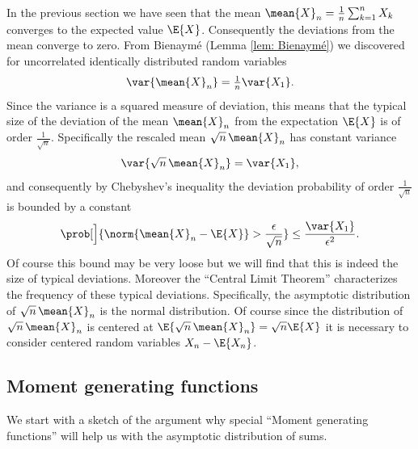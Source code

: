 In the previous section we have seen that the mean \(\mean{X}_n =
\frac1n\sum_{k=1}^n X_k\) converges to the expected value \(\E{X}\).
Consequently the deviations from the mean converge to zero. From Bienaymé (Lemma
\ref{lem: Bienaymé}) we discovered for uncorrelated identically distributed
random variables
\[
    \var{\mean{X}_n} = \tfrac1n \var{X_1}.
\]
Since the variance is a squared measure of deviation, this means
that the typical size of the deviation of the mean \(\mean{X}_n\) from the expectation
\(\E{X}\) is of order \(\frac1{\sqrt{n}}\).
Specifically the rescaled mean \(\sqrt{n}\,\mean{X}_n\) has
constant variance
\[
    \var{\sqrt{n}\,\mean{X}_n} = \var{X_1},
\]
and consequently by Chebyshev's inequality the deviation probability of order \(\frac{1}{\sqrt{n}}\) is
bounded by a constant
\[
    \prob[\Big]{\norm{\mean{X}_n - \E{X}} > \frac{\epsilon}{\sqrt{n}}}
    \le \frac{\var{X_1}}{\epsilon^2}.
\]
Of course this bound may be very loose but we will find that this is indeed
the size of typical deviations. Moreover the ``Central Limit Theorem''
characterizes the frequency of these typical deviations. Specifically, the asymptotic distribution of \(\sqrt{n}\,
\mean{X}_n\) is the normal distribution. Of course since the distribution of
\(\sqrt{n}\, \mean{X}_n\) is centered at \(\E{\sqrt{n}\, \mean{X}_n} = \sqrt{n}
\E{X}\) it is necessary to consider centered random variables \(X_n -
\E{X_n}\).


\subsection{Moment generating functions}
\label{sec: moment generating functions}

We start with a sketch of the argument why special ``Moment generating
functions'' will help us with the asymptotic distribution of sums.

